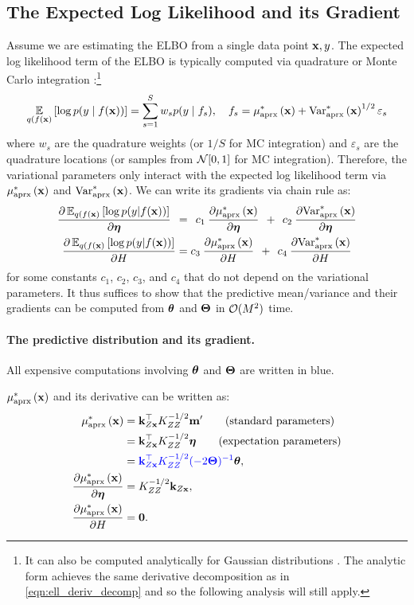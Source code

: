 \subsection{The Expected Log Likelihood and its Gradient}
Assume we are estimating the ELBO from a single data point $\mathbf{x}, y$.
The expected log likelihood term of the ELBO is typically computed via quadrature or Monte Carlo integration \cite{hensman2015scalable}:\footnote{
  It can also be computed analytically for Gaussian distributions \cite{hensman2013gaussian}.
  The analytic form achieves the same derivative decomposition as in \cref{eqn:ell_deriv_decomp}
  and so the following analysis will still apply.
}
%
\[
  \operatorname*{\mathbb{E}}_{q(f(\mathbf{x})} \left[  \log p(y \mid f(\mathbf{x}))  \right] = \sum_{s=1}^S w_s p(y \mid f_s),
  \quad
  f_s = \mu^*_\text{aprx} \left( \mathbf{x} \right) + \text{Var}^*_\text{aprx} \left( \mathbf{x} \right)^{1/2} \varepsilon_s
\]
%
where $w_s$ are the quadrature weights (or $1/S$ for MC integration) and $\varepsilon_s$ are the quadrature locations (or samples from $\normaldist{0}{1}$ for MC integration).
Therefore, the variational parameters only interact with the expected log likelihood term via $\mu^*_\text{aprx} \left( \mathbf{x} \right)$ and $\text{Var}^*_\text{aprx} \left( \mathbf{x} \right)$.
We can write its gradients via chain rule as:
%
\begin{align}
  \frac{ \partial \operatorname*{\mathbb{E}}_{q(f(\mathbf{x})} \left[  \log p(y | f(\mathbf{x}))  \right]}{\partial \boldsymbol{\eta}}
  \:\: &= \:\:
  c_1 \: \frac{ \partial \mu^*_\text{aprx} \left( \mathbf{x} \right)}{\partial \boldsymbol{\eta}}
  \:\: + \:\:
  c_2 \:  \frac{ \partial \text{Var}^*_\text{aprx} \left( \mathbf{x} \right)}{\partial \boldsymbol{\eta}}
  \nonumber \\
  \frac{ \partial \operatorname*{\mathbb{E}}_{q(f(\mathbf{x})} \left[  \log p(y | f(\mathbf{x}))  \right]}{\partial H}
  &=
  c_3 \: \frac{ \partial \mu^*_\text{aprx} \left( \mathbf{x} \right)}{\partial H}
  \:\: + \:\:
  c_4 \:  \frac{ \partial \text{Var}^*_\text{aprx} \left( \mathbf{x} \right)}{\partial H}
  \label{eqn:ell_deriv_decomp}
\end{align}
%
for some constants $c_1$, $c_2$, $c_3$, and $c_4$ that do not depend on the variational parameters.
It thus suffices to show that the predictive mean/variance and their gradients can be computed from $\boldsymbol{\theta}$ and $\boldsymbol{\Theta}$ in $\bigo{M^2}$ time.

\paragraph{The predictive distribution and its gradient.}
All expensive computations involving $\boldsymbol{\theta}$ and $\boldsymbol{\Theta}$ are written in {\color{blue} blue}.

$\mu^*_\text{aprx} \left( \mathbf{x} \right)$ and its derivative can be written as:
%
\begin{align}
  \mu^*_\text{aprx} \left( \mathbf{x} \right)
  &= \mathbf{k}_{Z \mathbf{x}}^\top K_{ZZ}^{-1/2} \mathbf{m}'
  \tag{standard parameters} \\
  &= \mathbf{k}_{Z \mathbf{x}}^\top K_{ZZ}^{-1/2} \boldsymbol{\eta}
  \tag{expectation parameters} \\
  &= {\color{blue} \mathbf{k}_{Z \mathbf{x}}^\top K_{ZZ}^{-1/2} (-2 \boldsymbol{\Theta})^{-1}} \boldsymbol{\theta}
  \label{eqn:pred_mean_natural},
  \\
  \frac{\partial \mu^*_\text{aprx} \left( \mathbf{x} \right)}{\partial \boldsymbol{\eta}}
  &= K_{ZZ}^{-1/2} \mathbf{k}_{Z \mathbf{x}}
  \label{eqn:pred_mean_deriv},
  \\
  \frac{\partial \mu^*_\text{aprx} \left( \mathbf{x} \right)}{\partial H}
  &= \mathbf{0}.
  \nonumber
\end{align}

